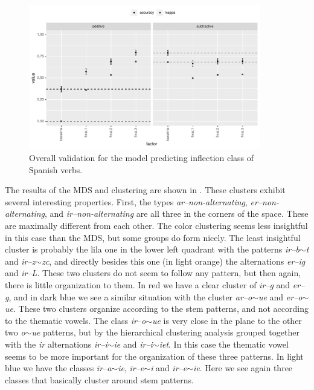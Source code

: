 \begin{figure}
  \includegraphics[width=0.9\textwidth]{./figures/spanish/p-fi-mini-overall.pdf}
  \caption{Overall validation  for the model predicting inflection class of Spanish verbs.}
  \label{fig:overall-sp-verbs}
\end{figure}


The results of the MDS and clustering are shown in . These clusters exhibit several interesting properties. First, the types \textit{ar--non-alternating}, \textit{er--non-alternating}, and \textit{ir--non-alternating} are all three in the corners of the space. These are maximally different from each other. The color clustering seems less insightful in this case than the MDS, but some groups do form nicely. The least insightful cluster is probably the lila one in the lower left quadrant with the patterns \textit{ir--b$\sim$t} and \textit{ir--z$\sim$zc}, and directly besides this one (in light orange) the alternations \textit{er--ig} and \textit{ir--L}. These two clusters do not seem to follow any pattern, but then again, there is little organization to them. In red we have a clear cluster of \textit{ir--g} and \textit{er--g}, and in dark blue we see a similar situation with the cluster \textit{ar--o$\sim$ue} and \textit{er--o$\sim$ue}. These two clusters organize according to the stem patterns, and not according to the thematic vowels. The class \textit{ir--o$\sim$ue} is very close in the plane to the other two \textit{o$\sim$ue} patterns, but by the hierarchical clustering analysis grouped together with the \textit{ir} alternations \textit{ir--i$\sim$ie} and \textit{ir--i$\sim$iet}. In this case the thematic vowel seems to be more important for the organization of these three patterns. In light blue we have the classes \textit{ir--a$\sim$ie}, \textit{ir--e$\sim$i} and \textit{ir--e$\sim$ie}. Here we see again three classes that basically cluster around stem patterns.

